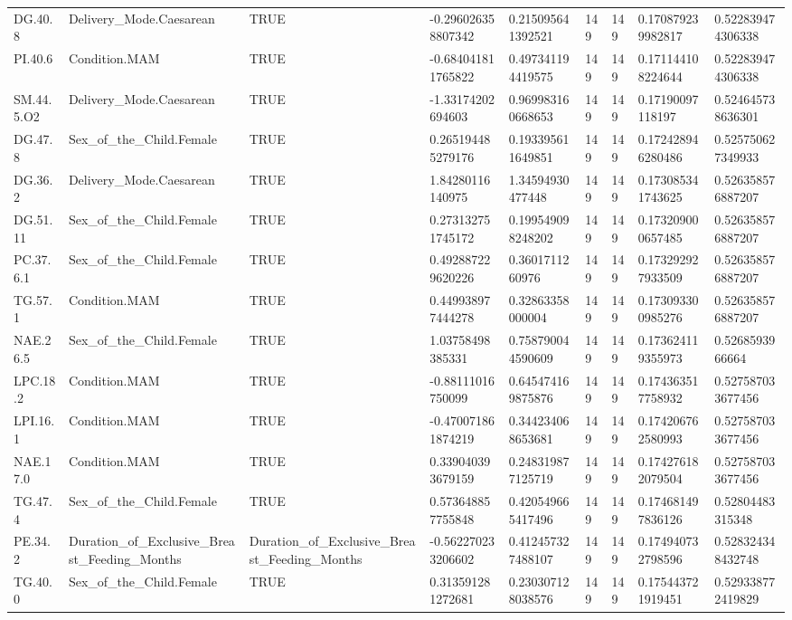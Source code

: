 \begin{longtable}{lllllllll}
DG.40.8 & Delivery\_Mode.Caesarean & TRUE & -0.296026358807342 & 0.215095641392521 & 149 & 149 & 0.170879239982817 & 0.522839474306338 \\
PI.40.6 & Condition.MAM & TRUE & -0.684041811765822 & 0.497341194419575 & 149 & 149 & 0.171144108224644 & 0.522839474306338 \\
SM.44.5.O2 & Delivery\_Mode.Caesarean & TRUE & -1.33174202694603 & 0.969983160668653 & 149 & 149 & 0.17190097118197 & 0.524645738636301 \\
DG.47.8 & Sex\_of\_the\_Child.Female & TRUE & 0.265194485279176 & 0.193395611649851 & 149 & 149 & 0.172428946280486 & 0.525750627349933 \\
DG.36.2 & Delivery\_Mode.Caesarean & TRUE & 1.84280116140975 & 1.34594930477448 & 149 & 149 & 0.173085341743625 & 0.526358576887207 \\
DG.51.11 & Sex\_of\_the\_Child.Female & TRUE & 0.273132751745172 & 0.199549098248202 & 149 & 149 & 0.173209000657485 & 0.526358576887207 \\
PC.37.6.1 & Sex\_of\_the\_Child.Female & TRUE & 0.492887229620226 & 0.3601711260976 & 149 & 149 & 0.173292927933509 & 0.526358576887207 \\
TG.57.1 & Condition.MAM & TRUE & 0.449938977444278 & 0.32863358000004 & 149 & 149 & 0.173093300985276 & 0.526358576887207 \\
NAE.26.5 & Sex\_of\_the\_Child.Female & TRUE & 1.03758498385331 & 0.758790044590609 & 149 & 149 & 0.173624119355973 & 0.5268593966664 \\
LPC.18.2 & Condition.MAM & TRUE & -0.88111016750099 & 0.645474169875876 & 149 & 149 & 0.174363517758932 & 0.527587033677456 \\
LPI.16.1 & Condition.MAM & TRUE & -0.470071861874219 & 0.344234068653681 & 149 & 149 & 0.174206762580993 & 0.527587033677456 \\
NAE.17.0 & Condition.MAM & TRUE & 0.339040393679159 & 0.248319877125719 & 149 & 149 & 0.174276182079504 & 0.527587033677456 \\
TG.47.4 & Sex\_of\_the\_Child.Female & TRUE & 0.573648857755848 & 0.420549665417496 & 149 & 149 & 0.174681497836126 & 0.52804483315348 \\
PE.34.2 & Duration\_of\_Exclusive\_Breast\_Feeding\_Months & Duration\_of\_Exclusive\_Breast\_Feeding\_Months & -0.562270233206602 & 0.412457327488107 & 149 & 149 & 0.174940732798596 & 0.528324348432748 \\
TG.40.0 & Sex\_of\_the\_Child.Female & TRUE & 0.313591281272681 & 0.230307128038576 & 149 & 149 & 0.175443721919451 & 0.529338772419829 \\

\end{longtable}
